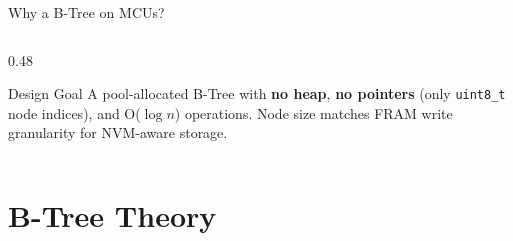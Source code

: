 \documentclass[aspectratio=169, 10pt]{beamer}
\begin{document}
\begin{frame}{Why a B-Tree on MCUs?}
\begin{columns}[T]
\begin{column}{0.48\textwidth}
\vspace{0.5em}
\begin{alertblock}{Design Goal}
A pool-allocated B-Tree with \textbf{no heap}, \textbf{no pointers} (only
\texttt{uint8\_t} node indices), and O($\log n$) operations.
Node size matches FRAM write granularity for NVM-aware storage.
\end{alertblock}
\end{column}
\end{columns}
\end{frame}

\section{B-Tree Theory}
\end{document}
